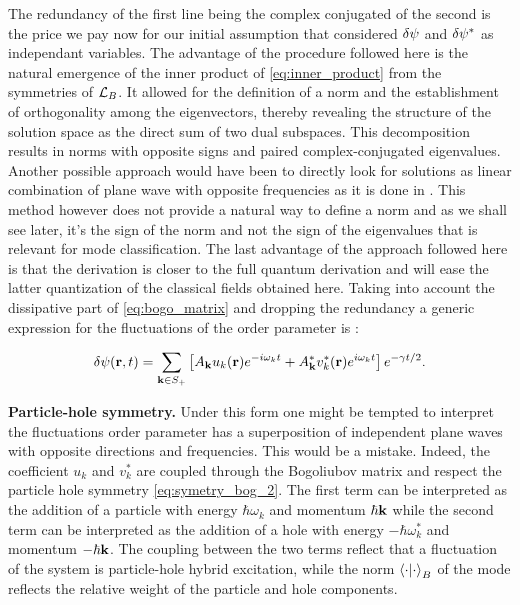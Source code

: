 The redundancy of the first line being the complex conjugated of the second is the price we pay now for our initial assumption that considered $\delta\psi$ and $\delta\psi^*$ as independant variables. The advantage of the
procedure followed here is the natural emergence of the inner product of \autoref{eq:inner_product} from the symmetries of $\mathcal{L}_B$. It allowed for the definition of a norm and the establishment of orthogonality among the eigenvectors, 
thereby revealing the structure of the solution space as the direct sum of two dual subspaces. This decomposition results in norms with opposite signs and paired complex-conjugated eigenvalues. Another possible approach would have been
to directly look for solutions as linear combination of plane wave with opposite frequencies as it is done in \cite{pethick_bose-einstein_2008}. This method however does not provide a natural way to define a norm and as we shall
see later, it's the sign of the norm and not the sign of the eigenvalues that is relevant for mode classification. The last advantage of the approach followed here is that the derivation
is closer to the full quantum derivation and will ease the latter quantization of the classical fields obtained here. Taking into account the dissipative part of \autoref{eq:bogo_matrix} and dropping the redundancy a generic
expression for the fluctuations of the order parameter is :

\begin{equation}
    \delta\psi(\mathbf{r},t) = \sum_{\mathbf{k} \in S_+} \left[A_{\mathbf{k}} u_k(\mathbf{r})e^{-i\omega_kt}+A_{\mathbf{k}}^*v_k^*(\mathbf{r})e^{i\omega_kt}\right]e^{-\gamma t/2}.
    \label{eq:fluctuation_order_parameter}
\end{equation}
\bigskip

\textbf{Particle-hole symmetry.} Under this form one might be tempted to interpret the fluctuations order parameter has a superposition of independent plane waves with opposite directions and frequencies.
This would be a mistake. Indeed, the coefficient $u_k$ and $v_k^*$ are coupled through the Bogoliubov matrix and respect the particle hole symmetry \autoref{eq:symetry_bog_2}. The first term
can be interpreted as the addition of a particle with energy $\hbar\omega_k$ and momentum $\hbar\mathbf{k}$ while the second term can be interpreted as the addition of a hole with energy $-\hbar\omega_k^*$ and momentum $-\hbar\mathbf{k}$. The coupling
between the two terms reflect that a fluctuation of the system is particle-hole hybrid excitation, while the norm $\bra{\cdot}\ket{\cdot}_B$ of the mode reflects the relative weight of the particle and hole components.

